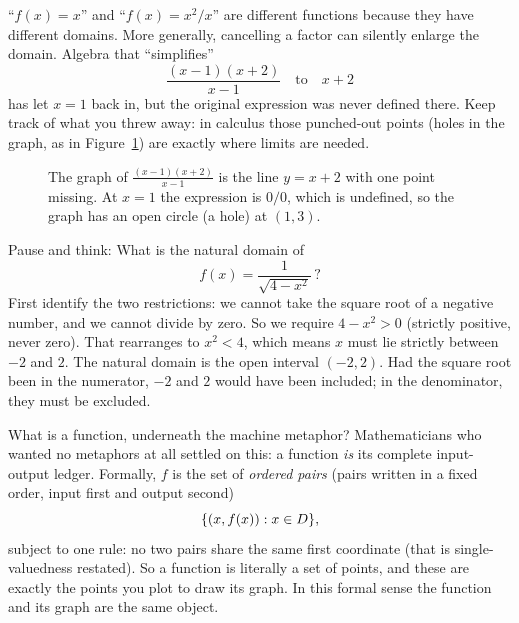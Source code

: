 \begin{trapbox}
``$f(x) = x$'' and ``$f(x) = x^2/x$'' are different functions because they
have different domains. More generally, cancelling a factor can silently enlarge
the domain. Algebra that ``simplifies''
\[
  \frac{(x-1)(x+2)}{x-1} \quad\text{to}\quad x+2
\]
has let $x=1$ back in, but the original expression was never defined
there. Keep track of what you threw away: in calculus those punched-out points
(holes in the graph, as in Figure~\ref{ch02:fig-hole}) are exactly where limits are
needed.
\end{trapbox}

\begin{figure}[htbp]
\centering
{}
\caption{The graph of $\frac{(x-1)(x+2)}{x-1}$ is the line $y=x+2$ with one point
missing. At $x=1$ the expression is $0/0$, which is undefined, so the graph has an
open circle (a hole) at $(1,3)$.}
\label{ch02:fig-hole}
\end{figure}

\begin{recoverybox}
Pause and think: What is the natural domain of
\[
  f(x) = \frac{1}{\sqrt{4 - x^2}}\,?
\]
First identify the two restrictions: we cannot take the square root of a negative
number, and we cannot divide by zero. So we require $4 - x^2 > 0$ (strictly
positive, never zero). That rearranges to $x^2 < 4$, which means $x$ must lie
strictly between $-2$ and $2$. The natural domain is the open interval $(-2, 2)$.
Had the square root been in the numerator, $-2$ and $2$ would have been included;
in the denominator, they must be excluded.
\end{recoverybox}

\begin{happeningbox}
What is a function, underneath the machine metaphor? Mathematicians who
wanted no metaphors at all settled on this: a function \emph{is} its complete
input-output ledger. Formally, $f$ is the set of \emph{ordered pairs} (pairs
written in a fixed order, input first and output second)
\[
  \{ (x, f(x)) : x \in D \},
\]
subject to one rule: no two pairs share the same first coordinate (that is
single-valuedness restated). So a function is literally a set of points, and
these are exactly the points you plot to draw its graph. In this formal sense
the function and its graph are the same object.
\end{happeningbox}

